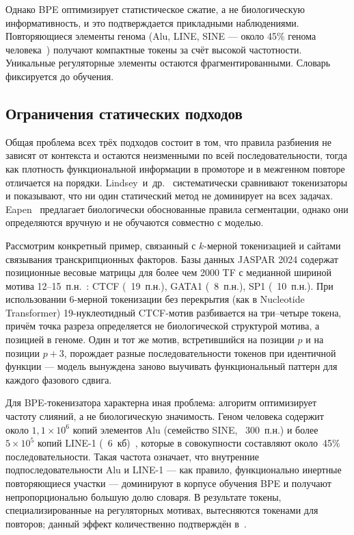 Однако BPE оптимизирует статистическое сжатие, а не биологическую
информативность, и это подтверждается прикладными наблюдениями.
Повторяющиеся элементы генома (Alu, LINE, SINE --- около 45\% генома
человека~\cite{landerInitialSequencingAnalysis2001}) получают
компактные токены за счёт высокой частотности. Уникальные
регуляторные элементы остаются фрагментированными. Словарь
фиксируется до обучения.

\subsection{Ограничения статических подходов}

Общая проблема всех трёх подходов состоит в том, что правила
разбиения не зависят от контекста и остаются неизменными по всей
последовательности, тогда как плотность функциональной информации в
промоторе и в межгенном повторе отличается на порядки.
Lindsey~и~др.~\cite{lindseyImpactTokenizerSelection2025}
систематически сравнивают токенизаторы и показывают, что ни один
статический метод не доминирует на всех задачах.
Eapen~\cite{eapenGenomicTokenizerBiologydriven2025} предлагает
биологически обоснованные правила сегментации, однако они определяются
вручную и не обучаются совместно с моделью.

Рассмотрим конкретный пример, связанный с $k$-мерной токенизацией и
сайтами связывания транскрипционных факторов. Базы данных JASPAR 2024
содержат позиционные весовые матрицы для более чем 2000 TF с медианной
шириной мотива 12--15~п.н.~\cite{rauluseviciuteJASPAR2024}: CTCF
(~19~п.н.), GATA1 (~8~п.н.), SP1 (~10~п.н.). При использовании
6-мерной токенизации без перекрытия (как в Nucleotide Transformer)
19-нуклеотидный CTCF-мотив разбивается на три--четыре токена, причём
точка разреза определяется не биологической структурой мотива, а
позицией в геноме. Один и тот же мотив, встретившийся на позиции $p$
и на позиции $p + 3$, порождает разные последовательности токенов при
идентичной функции --- модель вынуждена заново выучивать
функциональный паттерн для каждого фазового сдвига.

Для BPE-токенизатора характерна иная проблема: алгоритм оптимизирует
частоту слияний, а не биологическую значимость. Геном человека
содержит около $1{,}1 \times 10^6$ копий элементов Alu (семейство
SINE, ~300~п.н.) и более $5 \times 10^5$ копий LINE-1
(~6~кб)~\cite{landerInitialSequencingAnalysis2001}, которые в
совокупности составляют около~45\% последовательности. Такая частота
означает, что внутренние подпоследовательности Alu и LINE-1 --- как
правило, функционально инертные повторяющиеся участки --- доминируют
в корпусе обучения BPE и получают непропорционально большую долю
словаря. В результате токены, специализированные на регуляторных
мотивах, вытесняются токенами для повторов; данный эффект
количественно подтверждён в~\cite{lindseyImpactTokenizerSelection2025}.

